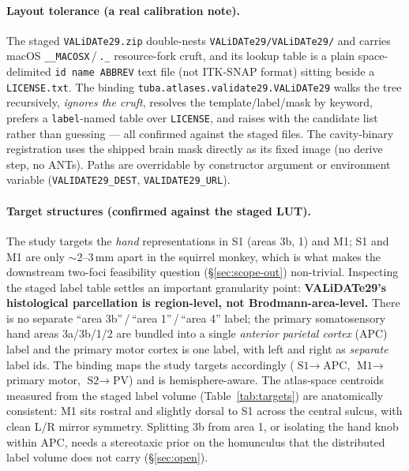 \documentclass{compactarticle}
\begin{document}
\paragraph{Layout tolerance (a real calibration note).}
The staged \texttt{VALiDATe29.zip} double-nests
\texttt{VALiDATe29/VALiDATe29/} and carries macOS
\texttt{\_\_MACOSX}\,/\,\texttt{.\_} resource-fork cruft, and its lookup
table is a plain space-delimited \texttt{id name ABBREV} text file (not
ITK-SNAP format) sitting beside a \texttt{LICENSE.txt}. The binding
\texttt{tuba.atlases.\allowbreak validate29.\allowbreak VALiDATe29}
walks the tree recursively, \emph{ignores the cruft}, resolves the
template/label/mask by keyword, prefers a \texttt{label}-named table
over \texttt{LICENSE}, and raises with the candidate list rather than
guessing --- all confirmed against the staged files. The cavity-binary
registration uses the shipped brain mask directly as its fixed image
(no derive step, no ANTs). Paths are overridable by constructor
argument or environment variable (\texttt{VALIDATE29\_DEST},
\texttt{VALIDATE29\_URL}).

\paragraph{Target structures (confirmed against the staged LUT).}
The study targets the \emph{hand} representations in S1 (areas 3b, 1)
and M1; S1 and M1 are only ${\sim}2$--3\,mm apart in the squirrel
monkey, which is what makes the downstream two-foci feasibility
question (\S\ref{sec:scope-out}) non-trivial. Inspecting the staged
label table settles an important granularity point:
\textbf{VALiDATe29's histological parcellation is region-level, not
Brodmann-area-level.} There is no separate ``area 3b''\,/\,``area
1''\,/\,``area 4'' label; the primary somatosensory hand areas 3a/3b/1/2
are bundled into a single \emph{anterior parietal cortex} (APC) label
and the primary motor cortex is one label, with left and right as
\emph{separate} label ids. The binding maps the study targets
accordingly ($\text{S1}\to$APC, $\text{M1}\to$primary motor,
$\text{S2}\to$PV) and is hemisphere-aware. The atlas-space centroids
measured from the staged label volume (Table~\ref{tab:targets}) are
anatomically consistent: M1 sits rostral and slightly dorsal to S1
across the central sulcus, with clean L/R mirror symmetry. Splitting 3b
from area 1, or isolating the hand knob within APC, needs a stereotaxic
prior on the homunculus that the distributed label volume does not carry
(\S\ref{sec:open}).
\end{document}
